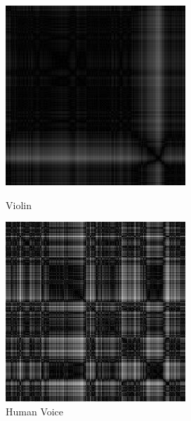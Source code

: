 \documentclass[letterpaper, 12 pt, conference]{ieeeconf}  %
\begin{document}
\begin{figure}[!htb]
   \begin{minipage}{0.24\textwidth}
     \centering
     \includegraphics[width=.7\linewidth]{../figs/mrp/vio.jpg}
     \caption{Violin}\label{fig:Vio_MRP}
   \end{minipage}\hfill
   \begin{minipage}{0.24\textwidth}
     \centering
     \includegraphics[width=.7\linewidth]{../figs/mrp/voi.jpg}
     \caption{Human Voice}\label{fig:Voi_MRP}
   \end{minipage}
\end{figure}
\end{document}

